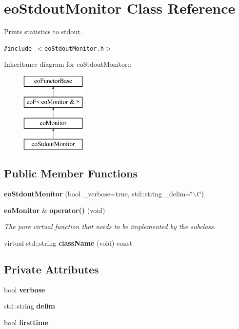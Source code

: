 \section{eo\-Stdout\-Monitor Class Reference}
\label{classeo_stdout_monitor}
Prints statistics to stdout.  


{\tt \#include $<$eo\-Stdout\-Monitor.h$>$}

Inheritance diagram for eo\-Stdout\-Monitor::\begin{figure}[H]
\begin{center}
\leavevmode
\includegraphics[height=4cm]{classeo_stdout_monitor}
\end{center}
\end{figure}
\subsection*{Public Member Functions}
\begin{CompactItemize}
\item 
{\bf eo\-Stdout\-Monitor} (bool \_\-verbose=true, std::string \_\-delim=\char`\"{}$\backslash$t\char`\"{})\label{classeo_stdout_monitor_a0}

\item 
{\bf eo\-Monitor} \& {\bf operator()} (void)\label{classeo_stdout_monitor_a1}

\begin{CompactList}\small\item\em The pure virtual function that needs to be implemented by the subclass. \item\end{CompactList}\item 
virtual std::string {\bf class\-Name} (void) const \label{classeo_stdout_monitor_a2}

\end{CompactItemize}
\subsection*{Private Attributes}
\begin{CompactItemize}
\item 
bool {\bf verbose}\label{classeo_stdout_monitor_r0}

\item 
std::string {\bf delim}\label{classeo_stdout_monitor_r1}

\item 
bool {\bf firsttime}\label{classeo_stdout_monitor_r2}

\end{CompactItemize}


